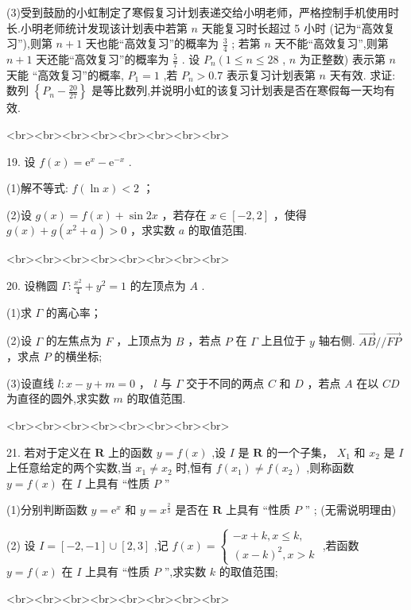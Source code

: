 \documentclass[11pt,a4paper]{article}
\renewcommand{\leq}{\leqslant}
\begin{document}
(3)受到鼓励的小虹制定了寒假复习计划表递交给小明老师，严格控制手机使用时长.小明老师统计发现该计划表中若第 $n$ 天能复习时长超过 5 小时 (记为“高效复习”),则第 $n + 1$ 天也能“高效复习”的概率为 $\frac{3}{4}$ ; 若第 $n$ 天不能“高效复习”,则第 $n + 1$ 天还能“高效复习”的概率为 $\frac{5}{7}$ . 设 ${P}_{n}\left( {1 \leq  n \leq  {28}}\right.$ , $n$ 为正整数) 表示第 $n$ 天能 “高效复习”的概率, ${P}_{1} = 1$ ,若 ${P}_{n} > {0.7}$ 表示复习计划表第 $n$ 天有效. 求证: 数列 $\left\{  {{P}_{n} - \frac{20}{27}}\right\}$ 是等比数列,并说明小虹的该复习计划表是否在寒假每一天均有效.


<br><br><br><br><br><br><br><br>


19. 设 $f\left( x\right)  = {\mathrm{e}}^{x} - {\mathrm{e}}^{-x}$ .

(1)解不等式: $f\left( {\ln x}\right)  < 2$ ；

(2)设 $g\left( x\right)  = f\left( x\right)  + \sin {2x}$ ，若存在 $x \in  \left\lbrack  {-2,2}\right\rbrack$ ，使得 $g\left( x\right)  + g\left( {{x}^{2} + a}\right)  > 0$ ，求实数 $a$ 的取值范围.


<br><br><br><br><br><br><br><br>


20. 设椭圆 $\Gamma  : \frac{{x}^{2}}{4} + {y}^{2} = 1$ 的左顶点为 $A$ .

(1)求 $\Gamma$ 的离心率；

(2)设 $\Gamma$ 的左焦点为 $F$ ，上顶点为 $B$ ，若点 $P$ 在 $\Gamma$ 上且位于 $y$ 轴右侧. $\overrightarrow{AB}//\overrightarrow{FP}$ ，求点 $P$ 的横坐标;

(3)设直线 $l : x - y + m = 0$ ， $l$ 与 $\Gamma$ 交于不同的两点 $C$ 和 $D$ ，若点 $A$ 在以 ${CD}$ 为直径的圆外,求实数 $m$ 的取值范围.


<br><br><br><br><br><br><br><br>


21. 若对于定义在 $\mathbf{R}$ 上的函数 $y = f\left( x\right)$ ,设 $I$ 是 $\mathbf{R}$ 的一个子集， ${X}_{1}$ 和 ${x}_{2}$ 是 $I$ 上任意给定的两个实数,当 ${x}_{1} \neq  {x}_{2}$ 时,恒有 $f\left( {x}_{1}\right)  \neq  f\left( {x}_{2}\right)$ ,则称函数 $y = f\left( x\right)$ 在 $I$ 上具有 “性质 $P$ ”

(1)分别判断函数 $y = {\mathrm{e}}^{x}$ 和 $y = {x}^{\frac{2}{3}}$ 是否在 $\mathbf{R}$ 上具有 “性质 $P$ ” ; (无需说明理由)

(2) 设 $I = \left\lbrack  {-2, - 1}\right\rbrack   \cup  \left\lbrack  {2,3}\right\rbrack$ ,记 $f\left( x\right)  = \left\{  \begin{array}{l}  - x + k, x \leq  k, \\  {\left( x - k\right) }^{2}, x > k \end{array}\right.$ ,若函数 $y = f\left( x\right)$ 在 $I$ 上具有 “性质 $P$ ”,求实数 $k$ 的取值范围;


<br><br><br><br><br><br><br><br>
\end{document}
